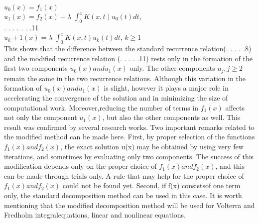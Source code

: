 \documentclass[12pt]{article}
\begin{document}
$u_0(x) = f_1(x)$\\
$u_1(x) = f_2(x) + \lambda$ \(\int_{0}^{x} K(x,t) u_0(t) dt\),\\
										. . . . . . .11\\
$u_k+1(x) = \lambda$ \(\int_{0}^{x} K(x,t) u_k(t) dt\), 	$k \geq 1$\\

This shows that the diﬀerence between the standard recurrence relation(. . . . .8) and the modiﬁed recurrence relation (. . .  . .11) rests only in the formation of the ﬁrst two components $u_0(x) and u_1(x)$ only. The other components $u_j,j \geq 2$ remain the same in the two recurrence relations. Although this variation in the formation of $u_0(x) and u_1(x)$ is slight, however it plays a major role in accelerating the convergence of the solution and in minimizing the size of computational work. Moreover,reducing the number of terms in $f_1(x)$ aﬀects not only the component $u_1(x)$, but also the other components as well. This result was conﬁrmed by several research works. Two important remarks related to the modiﬁed method can be made here. First, by proper selection of the functions $f_1(x) and f_2(x)$, the exact solution u(x) may be obtained by using very few iterations, and sometimes by evaluating only two components. The success of this modiﬁcation depends only on the proper choice of $f_1(x) and f_2(x)$, and this can be made through trials only. A rule that may help for the proper choice of $f_1(x) and f_2(x)$ could not be found yet. Second, if f(x) consistsof one term only, the standard decomposition method can be used in this case.
It is worth mentioning that the modiﬁed decomposition method will be used for Volterra and Fredholm integralequations, linear and nonlinear equations.\\
\end{document}
